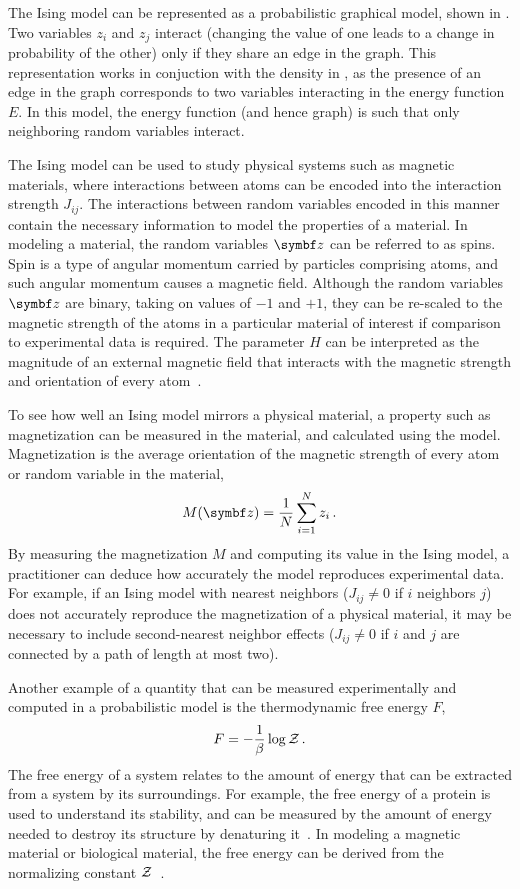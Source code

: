 The Ising model can be represented as a probabilistic graphical model, shown in . Two variables $z_i$ and $z_j$ interact (changing the value of one leads to a change in probability of the other) only if they share an edge in the graph. This representation works in conjuction with the density in , as the presence of an edge in the graph corresponds to two variables interacting in the energy function $E$. In this model, the energy function (and hence graph) is such that only neighboring random variables interact.

The Ising model can be used to study physical systems such as magnetic materials, where interactions between atoms can be encoded into the interaction strength $J_{ij}$. The interactions between random variables encoded in this manner contain the necessary information to model the properties of a material. In modeling a material, the random variables $\mbz$ can be referred to as spins. Spin is a type of angular momentum carried by particles comprising atoms, and such angular momentum causes a magnetic field. Although the random variables $\mbz$ are binary, taking on values of $-1$ and $+1$, they can be re-scaled to the magnetic strength of the atoms in a particular material of interest if comparison to experimental data is required. The parameter $H$ can be interpreted as the magnitude of an external magnetic field that interacts with the magnetic strength and orientation of every atom~\citep{chandler1987introduction}.

To see how well an Ising model mirrors a physical material, a property such as magnetization can be measured in the material, and calculated using the model. Magnetization is the average orientation of the magnetic strength of every atom or random variable in the material,
\begin{equation}
  M(\mbz) = \frac{1}{N}\sum_{i=1}^N z_i\, .
\end{equation}
By measuring the magnetization $M$ and computing its value in the Ising model, a practitioner can deduce how accurately the model reproduces experimental data. For example, if an Ising model with nearest neighbors ($J_{ij} \neq 0$ if $i$ neighbors $j$) does not accurately reproduce the magnetization of a physical material, it may be necessary to include second-nearest neighbor effects ($J_{ij}\neq 0$ if $i$ and $j$ are connected by a path of length at most two).

Another example of a quantity that can be measured experimentally and computed in a probabilistic model is the thermodynamic free energy $F$,
\begin{equation}
  \label{eq:free-energy}
  F = -\frac{1}{\beta} \log \mathcal{Z}\, .
\end{equation}
The free energy of a system relates to the amount of energy that can be extracted from a system by its surroundings. For example, the free energy of a protein is used to understand its stability, and can be measured by the amount of energy needed to destroy its structure by denaturing it~\citep{stone2013the-theory}. In modeling a magnetic material or biological material, the free energy can be derived from the normalizing constant $\mathcal{Z}$~\citep{chandler1987introduction}.

